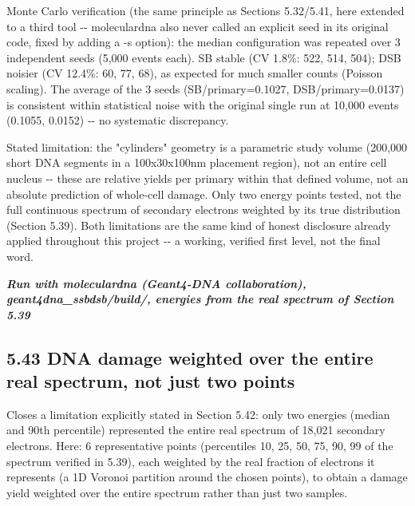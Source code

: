\documentclass[
  english,
]{article}
\begin{document}
Monte Carlo verification (the same principle as Sections 5.32/5.41, here extended to a third tool -\/- moleculardna also never called an explicit seed in its original code, fixed by adding a -s option): the median configuration was repeated over 3 independent seeds (5,000 events each). SB stable (CV 1.8\%: 522, 514, 504); DSB noisier (CV 12.4\%: 60, 77, 68), as expected for much smaller counts (Poisson scaling). The average of the 3 seeds (SB/primary=0.1027, DSB/primary=0.0137) is consistent within statistical noise with the original single run at 10,000 events (0.1055, 0.0152) -\/- no systematic discrepancy.

Stated limitation: the "cylinders" geometry is a parametric study volume (200,000 short DNA segments in a 100x30x100nm placement region), not an entire cell nucleus -\/- these are relative yields per primary within that defined volume, not an absolute prediction of whole-cell damage. Only two energy points tested, not the full continuous spectrum of secondary electrons weighted by its true distribution (Section 5.39). Both limitations are the same kind of honest disclosure already applied throughout this project -\/- a working, verified first level, not the final word.

\emph{\textbf{Run with moleculardna (Geant4-DNA collaboration), geant4dna\_\allowbreak{}ssbdsb/build/, energies from the real spectrum of Section 5.39}}

\subsection{5.43 DNA damage weighted over the entire real spectrum, not just two points}\label{dna-damage-weighted-over-the-entire-real-spectrum-not-just-two-points}

Closes a limitation explicitly stated in Section 5.42: only two energies (median and 90th percentile) represented the entire real spectrum of 18,021 secondary electrons. Here: 6 representative points (percentiles 10, 25, 50, 75, 90, 99 of the spectrum verified in 5.39), each weighted by the real fraction of electrons it represents (a 1D Voronoi partition around the chosen points), to obtain a damage yield weighted over the entire spectrum rather than just two samples.
\end{document}
